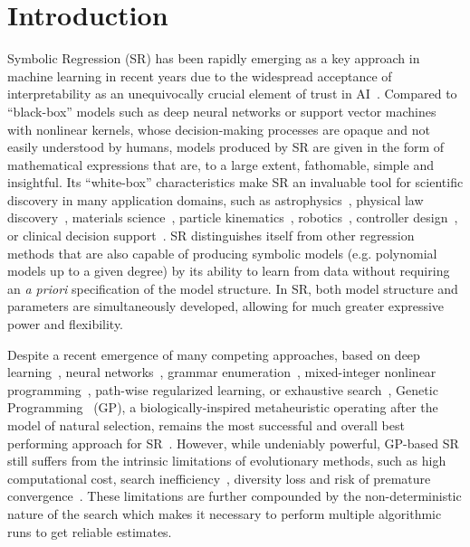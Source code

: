 \documentclass[openacc]{rstransa}%
\begin{document}




\maketitle

\section{Introduction}

Symbolic Regression (SR) has been rapidly emerging as a key approach in machine learning in recent years due to the widespread acceptance of interpretability as an unequivocally crucial element of trust in AI~\cite{rudin2022}. Compared to ``black-box'' models such as deep neural networks or support vector machines with nonlinear kernels, whose decision-making processes are opaque and not easily understood by humans, models produced by SR are given in the form of mathematical expressions that are, to a large extent, fathomable, simple and insightful.
%
Its ``white-box'' characteristics make SR an invaluable tool for scientific discovery in many application domains, such as astrophysics~\cite{matchev2022,bartlett2024}, physical law discovery~\cite{desmond2023,lemos2023,grayeli2024}, materials science~\cite{wang2019,wang2022,wang2024}, particle kinematics~\cite{dong2023,morales-alvarado2024}, robotics~\cite{zhang2023}, controller design~\cite{danai2021}, or clinical decision support~\cite{lacava2023}.
%
SR distinguishes itself from other regression methods that are also capable of producing symbolic models (e.g. polynomial models up to a given degree) by its ability to learn from data without requiring an \emph{a priori} specification of the model structure. In SR, both model structure and parameters are simultaneously developed, allowing for much greater expressive power and flexibility.

Despite a recent emergence of many competing approaches, based on deep learning~\cite{petersen2021,kamienny2022,landajuela2022,vastl2024}, neural networks~\cite{sahoo2018}, grammar enumeration~\cite{worm2013}, mixed-integer nonlinear programming~\cite{cozad2018}, path-wise regularized learning\cite{mcconaghy2011}, or exhaustive search~\cite{kammerer2020,bartlett2024}, Genetic Programming~\cite{koza1992} (GP), a biologically-inspired metaheuristic operating after the model of natural selection, remains the most successful and overall best performing approach for SR~\cite{lacava2021,defranca2024}.
%
However, while undeniably powerful, GP-based SR still suffers from the intrinsic limitations of evolutionary methods, such as high computational cost, search inefficiency~\cite{kronberger2024}, diversity loss and risk of premature convergence~\cite{burks2015,chen2021}. These limitations are further compounded by the non-deterministic nature of the search which makes it necessary to perform multiple algorithmic runs to get reliable estimates.
\end{document}
